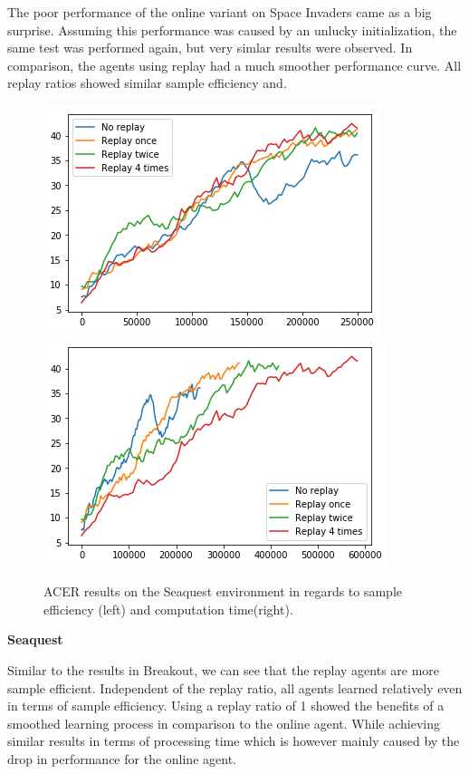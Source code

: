 The poor performance of the online variant on Space Invaders came as a big surprise. Assuming this performance was caused by an unlucky initialization, the same test was performed again, but very simlar results were observed. In comparison, the agents using replay had a much smoother performance curve.
All replay ratios showed similar sample efficiency and.
\begin{figure}[h]
\includegraphics[scale=0.55]{bilder/seaquestbyonline.png}
\includegraphics[scale=0.55]{bilder/seaquestbytime.png}
\caption{ACER results on the Seaquest environment in regards to sample efficiency (left) and computation time(right).}
\label{seafig}
\end{figure}

\textbf{Seaquest}

Similar to the results in Breakout, we can see that the replay agents are more sample efficient. Independent of the replay ratio, all agents learned relatively even in terms of sample efficiency.
Using a replay ratio of 1 showed the benefits of a smoothed learning process in comparison to the online agent. \linebreak While achieving similar results in terms of processing time which is however mainly caused by the drop in performance for the online agent.
 


